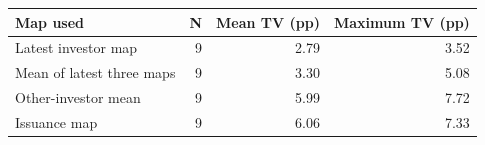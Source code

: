 \begin{tabular}{lrrr}
\toprule
Map used & N & Mean TV (pp) & Maximum TV (pp) \\
\midrule
Latest investor map & 9 & 2.79 & 3.52 \\
Mean of latest three maps & 9 & 3.30 & 5.08 \\
Other-investor mean & 9 & 5.99 & 7.72 \\
Issuance map & 9 & 6.06 & 7.33 \\
\bottomrule
\end{tabular}
